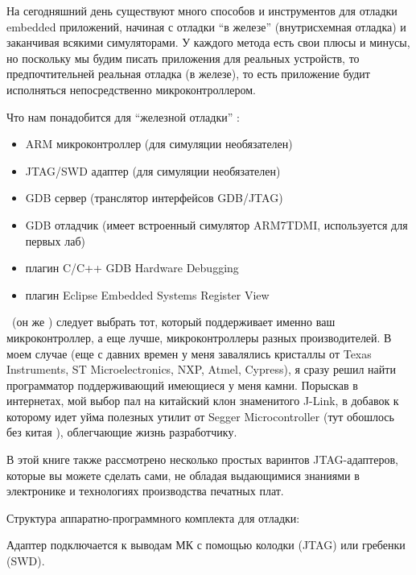 \label{labgdbinst}


 На сегодняшний день существуют много способов и инструментов для отладки
 embedded приложений, начиная с отладки “в железе” (внутрисхемная отладка)  и
 заканчивая всякими симуляторами. У каждого метода есть свои плюсы и минусы, но
 поскольку мы будим писать приложения для реальных устройств, то
 предпочтительней реальная отладка (в железе), то есть приложение будит
 исполняться непосредственно микроконтроллером.
 
Что нам понадобится для “железной отладки” :

\begin{itemize}
  \item 
ARM микроконтроллер (для симуляции необязателен)
  \item 
JTAG/SWD адаптер (для симуляции необязателен)
  \item 
GDB сервер (транслятор интерфейсов GDB/JTAG)
  \item 
GDB отладчик (имеет встроенный симулятор ARM7TDMI, используется для первых лаб) 
  \item 
плагин C/C++ GDB Hardware Debugging 
  \item 
плагин Eclipse Embedded Systems Register View 
\end{itemize}

\ (он же ) следует выбрать тот, который
поддерживает именно ваш микроконтроллер, а еще лучше, микроконтроллеры разных
производителей.
В моем случае (еще с давних времен у меня завалялись кристаллы от Texas
Instruments, ST Microelectronics, NXP, Atmel, Cypress), я сразу решил найти
программатор поддерживающий имеющиеся у меня камни. Порыскав в интернетах, мой
выбор пал на китайский клон знаменитого J-Link, в добавок к которому идет уйма
полезных утилит от Segger Microcontroller (тут обошлось без китая \smiley),
облегчающие жизнь разработчику.

В этой книге также рассмотрено несколько простых варинтов JTAG-адаптеров,
которые вы можете сделать сами, не обладая выдающимися знаниями в электронике
и технологиях производства печатных плат.

\bigskip
Структура аппаратно-программного комплекта для отладки:


Адаптер подключается к выводам МК с помощью колодки (JTAG) или гребенки (SWD).

